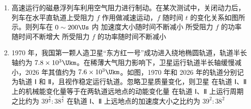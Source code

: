 \documentclass[\gkver]{gaokaozhenti}
\begin{document}
\begin{enumerate}
{a 在漂移区内做匀速直线运动，运动时长 $t_1$ 满足 $v_a\cos\theta\cdot t_1=L$，即 $t_1=\frac{L}{v_a\cos\theta}$。

a 在反射区内做匀减速直线运动，加速度大小 $a=\frac{q_aE}{m_a}=KE$，运动至电场最深处的时长 $t_2$ 满足 $KE\cdot t_2=v_a\cos\theta$，即 $t_2=\frac{v_a\cos\theta}{KE}$。

由运动的对称性可知，a 在质谱仪内的飞行总时间 $t_a=2(t_1+t_2)=2\left(\frac{L}{v_a\cos\theta}+\frac{v_a\cos\theta}{KE}\right)$。

同理，b 的飞行总时间 $t_b=2\left(\frac{L}{v_b\cos\theta}+\frac{v_b\cos\theta}{KE}\right)$。

由题意 $t_a=t_b$，联立可得 $\frac{L}{v_a\cos\theta}+\frac{v_a\cos\theta}{KE}=\frac{L}{v_b\cos\theta}+\frac{v_b\cos\theta}{KE}$，

整理得 $\frac{L(v_b-v_a)}{v_av_b\cos\theta}=\frac{(v_a-v_b)\cos\theta}{KE}$，即 $E=\frac{v_av_b\cos^2\theta}{KL}$。

故选 C。
}

\item
高速运行的磁悬浮列车利用空气阻力进行制动。在某次测试中，关闭动力后，列车在水平直轨道上受阻力 $f$ 作用做减速运动，$f$ 随时间 $t$ 的变化关系如图所示。则列车在 $0\sim200\Us$ 内
{加速度大小随时间不断减小}
{所受阻力 $f$ 的功率随时间不断增大}
{所受阻力 $f$ 的功率随时间不断减小}

\item
1970 年，我国第一颗人造卫星“东方红一号”成功进入绕地椭圆轨道，轨道半长轴约为 $7.8\times10^3\Ukm$。在稀薄大气阻力影响下，卫星运行轨道半长轴缓慢减小，2026 年其值约为 $7.6\times10^3\Ukm$。如图，1970 年和 2026 年的轨道分别记为轨道 Ⅰ 和 Ⅱ，且视作稳定运行轨道。忽略卫星质量变化，则卫星
{在轨道 Ⅰ、Ⅱ 上的机械能变化量等于在两轨道远地点的动能变化量}
{在轨道 Ⅰ、Ⅱ 上运行周期之比约为 $39^{\frac{3}{2}}:38^{\frac{3}{2}}$}
{在轨道 Ⅰ、Ⅱ 上远地点的加速度大小之比约为 $39^2:38^2$}
\end{enumerate}
\end{document}

